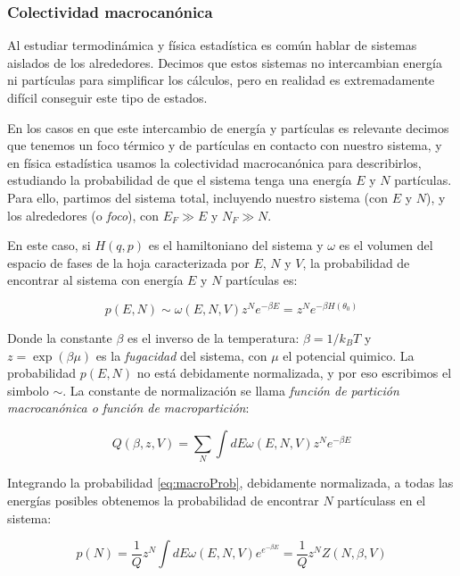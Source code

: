 \documentclass[11pt, a4paper]{article} %
\theoremstyle{named}
\begin{document}
\subsubsection{Colectividad macrocanónica}\label{sec:macrocanonica}

Al estudiar termodinámica y física estadística es común hablar de sistemas aislados de los alrededores. Decimos que estos sistemas no intercambian energía ni partículas para simplificar los cálculos, pero en realidad es extremadamente difícil conseguir este tipo de estados.

En los casos en que este intercambio de energía y partículas es relevante decimos que tenemos un foco térmico y de partículas en contacto con nuestro sistema, y en física estadística usamos la colectividad macrocanónica para describirlos, estudiando la probabilidad de que el sistema tenga una energía $E$ y $N$ partículas. Para ello, partimos del sistema total, incluyendo nuestro sistema (con $E$ y $N$), y los alrededores (o \textit{foco}), con $E_F\gg E$ y $N_F \gg N$.

En este caso, si $H(q,p)$ es el hamiltoniano del sistema y $\omega$ es el volumen del espacio de fases de la hoja caracterizada por $E$, $N$ y $V$, la probabilidad de encontrar al sistema con energía $E$ y $N$ partículas es:

\begin{equation}\label{eq:macroProb}
p(E, N) \sim \omega(E, N, V) z^{N} e^{-\beta E}=z^{N} e^{-\beta H\left(\theta_{0}\right)}
\end{equation}

Donde la constante $\beta$ es el inverso de la temperatura: $\beta=1 / k_{B} T$ y $z=\exp (\beta \mu)$ es la \textit{fugacidad} del sistema, con $\mu$ el potencial quimico. La probabilidad $p(E, N)$ no está debidamente normalizada, y por eso escribimos el simbolo $\sim$. La constante de normalización se llama \textit{función de partición macrocanónica o función de macropartición}:

\begin{equation}
    Q(\beta, z, V)=\sum_{N} \int d E \omega(E, N, V) z^{N} e^{-\beta E}
\end{equation}

Integrando la probabilidad \eqref{eq:macroProb}, debidamente normalizada, a todas las energías posibles obtenemos la probabilidad de encontrar $N$ partículass en el sistema:

\begin{equation}
    p(N)=\frac{1}{Q} z^{N} \int d E \omega(E, N, V) e^{e^{-\beta E}}=\frac{1}{Q} z^{N} Z(N, \beta, V)
\end{equation}
\end{document}
